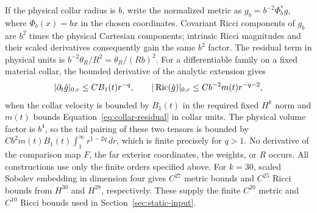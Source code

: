 \begin{remark}
\label{collar:scaling-interface}
If the physical collar radius is \(b\), write the normalized
metric as \(g_b=b^{-2}\Phi_b^*g\), where \(\Phi_b(x)=bx\) in
the chosen coordinates.  Covariant Ricci components of \(g_b\)
are \(b^2\) times the physical Cartesian components; intrinsic
Ricci magnitudes and their scaled derivatives consequently gain
the same \(b^2\) factor.  The residual term in physical units is
\(b^{-2}\theta_R/R^2=\theta_R/(Rb)^2\).
For a differentiable family on a fixed material collar, the
bounded derivative of the analytic extension gives
\[
 |\partial_t\hat g|_{0,r}\le CB_1(t)r^{-q},\qquad
 |\operatorname{Ric}(\hat g)|_{0,r}\le Cb^{-2}m(t)r^{-q-2},
\]
when the collar velocity is bounded by \(B_1(t)\) in the
required fixed \(H^k\) norm and \(m(t)\) bounds
Equation~\eqref{eq:collar-residual} in collar units.
The physical volume factor is \(b^4\), so the tail pairing
of these two tensors is bounded by
\(Cb^2m(t)B_1(t)\int_1^\infty r^{1-2q}\,dr\), which is finite
precisely for \(q>1\).  No derivative of the comparison map
\(F\), the far exterior coordinates, the weights, or \(R\) occurs.
All constructions use only the finite orders specified above.
For \(k=30\), scaled Sobolev embedding in dimension four gives
\(C^{27}\) metric bounds and \(C^{25}\) Ricci bounds from
\(H^{30}\) and \(H^{28}\), respectively.  These supply the finite
\(C^{20}\) metric and \(C^{10}\) Ricci bounds used in
Section~\ref{sec:static-input}.
\end{remark}
